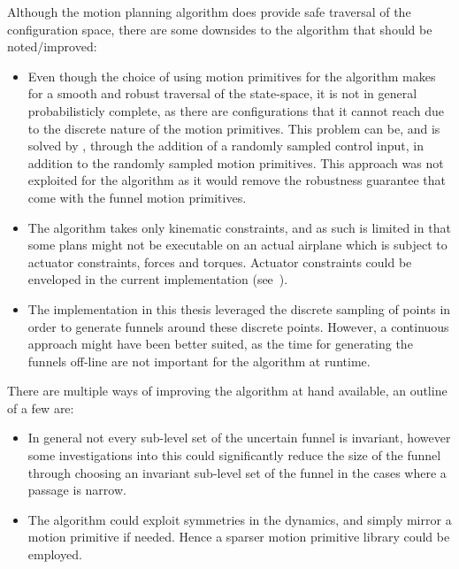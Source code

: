 Although the \rrtfunnel{} motion planning algorithm does provide safe traversal
of the configuration space, there are some downsides to the algorithm that
should be noted/improved:
\begin{itemize}

\item Even though the choice of using motion primitives for the \rrtfunnel{}
  algorithm makes for a smooth and robust traversal of the state-space, it is
  not in general probabilisticly complete, as there are configurations that it
  cannot reach due to the discrete nature of the motion primitives. This problem
  can be, and is solved by \textcite{vonasekGlobalMotionPlanning2013}, through
  the addition of a randomly sampled control input, in addition to the randomly
  sampled motion primitives. This approach was not exploited for the
  \rrtfunnel{} algorithm as it would remove the robustness guarantee that come
  with the funnel motion primitives.

\item The algorithm takes only kinematic constraints, and as such is limited in
  that some plans might not be executable on an actual airplane which is subject
  to actuator constraints, forces and torques. Actuator constraints could be
  enveloped in the current implementation
  (see~\cite[sec.4.3.3]{majumdarFunnelLibrariesRealtime2017}).

\item The implementation in this thesis leveraged the discrete sampling of
  points in order to generate funnels around these discrete points. However, a
  continuous approach might have been better suited, as the time for generating
  the funnels off-line are not important for the algorithm at runtime.

\end{itemize}

There are multiple ways of improving the algorithm at hand available, an outline
of a few are:

\begin{itemize}

  \item In general not every sub-level set of the uncertain funnel is invariant,
  however some investigations into this could significantly reduce the size of
  the funnel through choosing an invariant sub-level set of the funnel in the
  cases where a passage is narrow.

\item The algorithm could exploit symmetries in the dynamics, and simply mirror
  a motion primitive if needed. Hence a sparser motion primitive library could
  be employed.

\end{itemize}



